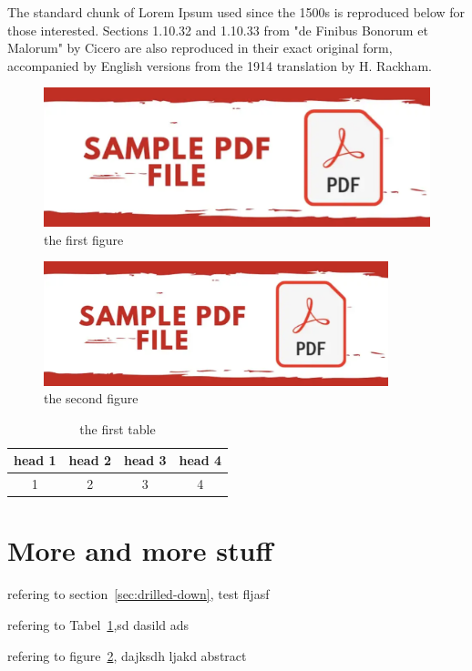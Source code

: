 \documentclass{article}
\begin{document}
The standard chunk of Lorem Ipsum used since the 1500s is reproduced below for those interested. Sections 1.10.32 and 1.10.33 from "de Finibus Bonorum et Malorum" by Cicero are also reproduced in their exact original form, accompanied by English versions from the 1914 translation by H. Rackham.
\begin{figure}
    \centering
    \includegraphics[width=12cm]{fig1}
    \caption{the first figure}\label{fig:first-figure}
\end{figure}

\begin{figure}
    \centering
    \includegraphics[width=10cm]{fig1}
    \caption{the second figure}\label{fig:second-figure}
\end{figure}


\begin{table}
    \centering
    \begin{tabular}{|c|c|c|c|}\hline

    head 1 & head 2 & head 3 & head 4 \\ \hline
    1      & 2      & 3      & 4      \\ \hline
    
    \hline        
    \end{tabular}
    \caption{the first table}\label{tab:first-table}  
\end{table}



\section{More and more stuff}

refering to section~\ref{sec:drilled-down}, test fljasf 

refering to Tabel~\ref{tab:first-table},sd dasild ads

refering to figure~\ref{fig:second-figure}, dajksdh ljakd abstract


\end{document}
